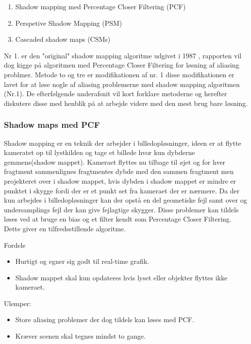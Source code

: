 \documentclass[11pt,a4paper]{article}
\begin{document}
\begin{enumerate}
  \item Shadow mapping med Percentage Closer Filtering (PCF)
  \item Perspetive Shadow Mapping (PSM)
  \item Cascaded shadow maps (CSMs)
\end{enumerate}

Nr 1. er den "original" shadow mapping algoritme udgivet i 1987 \cite{SMAP}, rapporten vil dog kigge på algoritmen med Percentage Closer Filtering for løsning af aliasing problmer. Metode to og tre er modifikationen af nr. 1 disse modifikationen er lavet for at løse nogle af aliasing problemerne med shadow mapping algoritmen (Nr.1). De efterfølgende underafsnit vil kort forklare metoderne og herefter diskutere disse med henblik på at arbejde videre med den mest brug bare løsning.

\subsubsection{Shadow maps med PCF}

Shadow mapping \cite{SMAP} er en teknik der arbejder i billedopløsninger, ideen er at flytte kameratet op til lystkilden og tage et billede hvor kun dybderne gemmens(shadow mappet). Kameraet flyttes nu tilbage til øjet og for hver fragtment sammenlignes fragtmentes dybde med den sammen fragtment men projekteret over i shadow mappet, hvis dybden i shadow mappet er mindre er punktet i skygge fordi der er et punkt set fra kameraet der er nærmere. Da der kun arbejdes i billedopløsninger kan der opstå en del geometiske fejl samt over og undersamplings fejl der kan give fejlagtige skygger. Disse problemer kan tildels løses ved at bruge en bias og et filter kendt som Percentage Closer Filtering. Dette giver en tilfredsstillende algoritme.

Fordele
\begin{itemize}
  \item Hurtigt og egner sig godt til real-time grafik.
  \item Shadow mappet skal kun opdateres hvis lyset eller objekter flyttes ikke kameraet.
\end{itemize}

Ulemper:
\begin{itemize}
  \item Store aliasing problemer der dog tildels kan løses med PCF.
  \item Kræver scenen skal tegnes mindst to gange.
\end{itemize}
\end{document}

